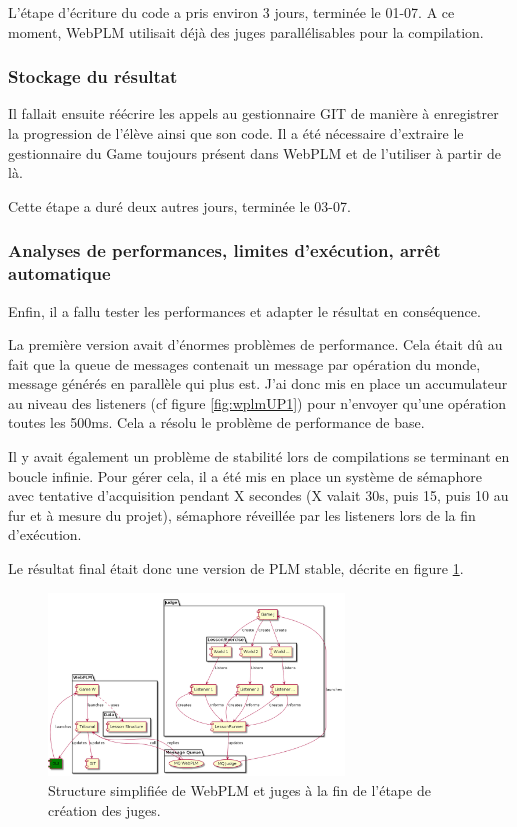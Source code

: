 \documentclass[stage]{tnreport}
\begin{document}
L'étape d'écriture du code a pris environ 3 jours, terminée le 01-07. A ce moment, WebPLM utilisait déjà des juges parallélisables pour la compilation.

\subsubsection{Stockage du résultat}
Il fallait ensuite réécrire les appels au gestionnaire GIT de manière à enregistrer la progression de l'élève ainsi que son code. Il a été nécessaire d'extraire le gestionnaire du Game toujours présent dans WebPLM et de l'utiliser à partir de là.

Cette étape a duré deux autres jours, terminée le 03-07.

\subsubsection{Analyses de performances, limites d'exécution, arrêt automatique}
Enfin, il a fallu tester les performances et adapter le résultat en conséquence.

La première version avait d'énormes problèmes de performance. Cela était dû au fait que la queue de messages contenait un message par opération du monde, message générés en parallèle qui plus est.
J'ai donc mis en place un accumulateur au niveau des listeners (cf figure \ref{fig:wplmUP1}) pour n'envoyer qu'une opération toutes les 500ms. Cela a résolu le problème de performance de base.

Il y avait également un problème de stabilité lors de compilations se terminant en boucle infinie. Pour gérer cela, il a été mis en place un système de sémaphore avec tentative d'acquisition pendant X secondes (X valait 30s, puis 15, puis 10 au fur et à mesure du projet), sémaphore réveillée par les listeners lors de la fin d'exécution.

Le résultat final était donc une version de PLM stable, décrite en figure \ref{fig:wplmUP2}.
\begin{figure}[h]
	\centering
		\includegraphics[width=0.7\textwidth]{figures/WebPLM-uml-cp2}
	\caption{Structure simplifiée de WebPLM et juges à la fin de l'étape de création des juges.}
	\label{fig:wplmUP2}
\end{figure}
\end{document}
